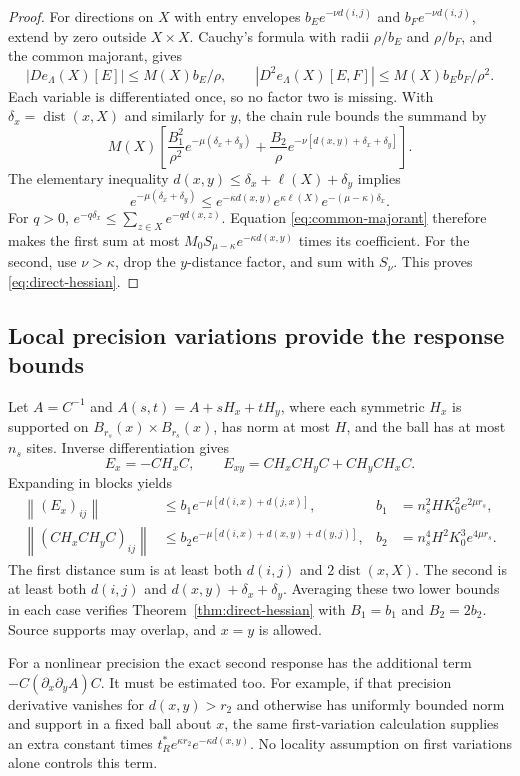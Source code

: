 \documentclass[11pt]{article}
\theoremstyle{remark}
\newcommand{\norm}[1]{\left\|#1\right\|}
\begin{document}
\begin{proof}
For directions on $X$ with entry envelopes
$b_Ee^{-\nu d(i,j)}$ and $b_Fe^{-\nu d(i,j)}$, extend by zero
outside $X\times X$. Cauchy's formula with radii $\rho/b_E$ and
$\rho/b_F$, and the common majorant, gives
\[
 |De_\Lambda(X)[E]|\le M(X)b_E/\rho,
 \qquad
 |D^2e_\Lambda(X)[E,F]|\le M(X)b_Eb_F/\rho^2.
\]
Each variable is differentiated once, so no factor two is missing.
With $\delta_x=\operatorname{dist}(x,X)$ and similarly for $y$,
the chain rule bounds the summand by
\[
 M(X)\left[
 \frac{B_1^2}{\rho^2}e^{-\mu(\delta_x+\delta_y)}
 +\frac{B_2}{\rho}e^{-\nu[d(x,y)+\delta_x+\delta_y]}
 \right].
\]
The elementary inequality
$d(x,y)\le\delta_x+\ell(X)+\delta_y$ implies
\[
 e^{-\mu(\delta_x+\delta_y)}
 \le e^{-\kappa d(x,y)}e^{\kappa\ell(X)}
       e^{-(\mu-\kappa)\delta_x}.
\]
For $q>0$, $e^{-q\delta_x}\le\sum_{z\in X}e^{-qd(x,z)}$.
Equation \eqref{eq:common-majorant} therefore makes the first sum
at most $M_0S_{\mu-\kappa}e^{-\kappa d(x,y)}$ times its coefficient.
For the second, use $\nu>\kappa$, drop the $y$-distance factor,
and sum with $S_\nu$. This proves \eqref{eq:direct-hessian}.
\end{proof}

\subsection{Local precision variations provide the response bounds}

Let $A=C^{-1}$ and $A(s,t)=A+sH_x+tH_y$, where each symmetric
$H_x$ is supported on $B_{r_s}(x)\times B_{r_s}(x)$, has norm at
most $H$, and the ball has at most $n_s$ sites. Inverse differentiation
gives
\[
 E_x=-CH_xC,\qquad
 E_{xy}=CH_xCH_yC+CH_yCH_xC.
\]
Expanding in blocks yields
\begin{align*}
 \norm{(E_x)_{ij}}
 &\le b_1e^{-\mu[d(i,x)+d(j,x)]},
 &b_1&=n_s^2HK_0^2e^{2\mu r_s},\\
 \norm{(CH_xCH_yC)_{ij}}
 &\le b_2e^{-\mu[d(i,x)+d(x,y)+d(y,j)]},
 &b_2&=n_s^4H^2K_0^3e^{4\mu r_s}.
\end{align*}
The first distance sum is at least both $d(i,j)$ and
$2\operatorname{dist}(x,X)$. The second is at least both $d(i,j)$
and $d(x,y)+\delta_x+\delta_y$. Averaging these two lower bounds
in each case verifies Theorem~\ref{thm:direct-hessian} with
$B_1=b_1$ and $B_2=2b_2$. Source supports may overlap, and $x=y$
is allowed.

For a nonlinear precision the exact second response has the additional
term $-C(\partial_x\partial_yA)C$. It must be estimated too.
For example, if that precision derivative vanishes for $d(x,y)>r_2$
and otherwise has uniformly bounded norm and support in a fixed ball
about $x$, the same first-variation calculation supplies an extra
constant times $t_R^*e^{\kappa r_2}e^{-\kappa d(x,y)}$.
No locality assumption on first variations alone controls this term.
\end{document}

